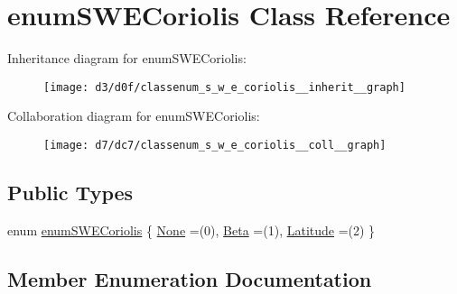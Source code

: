 \hypertarget{classenum_s_w_e_coriolis}{}\section{enum\+S\+W\+E\+Coriolis Class Reference}
\label{classenum_s_w_e_coriolis}


Inheritance diagram for enum\+S\+W\+E\+Coriolis\+:
\nopagebreak
\begin{figure}[H]
\begin{center}
\leavevmode
\texttt{[image: d3/d0f/classenum\_s\_w\_e\_coriolis\_\_inherit\_\_graph]}
\end{center}
\end{figure}


Collaboration diagram for enum\+S\+W\+E\+Coriolis\+:
\nopagebreak
\begin{figure}[H]
\begin{center}
\leavevmode
\texttt{[image: d7/dc7/classenum\_s\_w\_e\_coriolis\_\_coll\_\_graph]}
\end{center}
\end{figure}
\subsection*{Public Types}
\begin{DoxyCompactItemize}
\item 
enum \hyperlink{classenum_s_w_e_coriolis_ae486c69a845cf2c46e60b0dcc3221821}{enum\+S\+W\+E\+Coriolis} \{ \hyperlink{classenum_s_w_e_coriolis_ae486c69a845cf2c46e60b0dcc3221821a14399a0000d95a774b4eb6fe2f93928c}{None} =(0), 
\hyperlink{classenum_s_w_e_coriolis_ae486c69a845cf2c46e60b0dcc3221821aeb26ebf510469ffa0043dcdd8c5d0da0}{Beta} =(1), 
\hyperlink{classenum_s_w_e_coriolis_ae486c69a845cf2c46e60b0dcc3221821a2a35d8a4674da38c2999001dbd0216c3}{Latitude} =(2)
 \}
\end{DoxyCompactItemize}


\subsection{Member Enumeration Documentation}
\mbox{\label{classenum_s_w_e_coriolis_ae486c69a845cf2c46e60b0dcc3221821}} 
